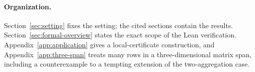 \paragraph{Organization.}
Section~\ref{sec:setting} fixes the setting; the cited sections
contain the results. Section~\ref{sec:formal-overview} states the exact
scope of the Lean verification. Appendix~\ref{app:application} gives a
local-certificate construction, and Appendix~\ref{app:three-span} treats
many rows in a three-dimensional matrix span, including a counterexample
to a tempting extension of the two-aggregation case.
